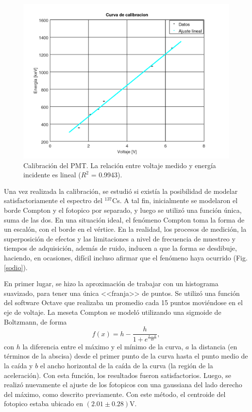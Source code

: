 \documentclass[twoside]{article}
\begin{document}
\begin{multicols}{2}
\begin{figure}[H]
    \centering
    \includegraphics[scale=0.4]{calibracion1.png}
    \caption{Calibración del PMT. La relación entre voltaje medido y energía incidente es lineal ($R^2$ = 0.9943).}
    \label{experimental}
\end{figure}

Una vez realizada la calibración, se estudió si existía la posibilidad de modelar satisfactoriamente el espectro del $^{137}$Cs. A tal fin, inicialmente se modelaron el borde Compton y el fotopico por separado, y luego se utilizó una función única, suma de las dos. En una situación ideal, el fenómeno Compton toma la forma de un escalón, con el borde en el vértice. En la realidad, los procesos de medición, la superposición de efectos y las limitaciones a nivel de frecuencia de muestreo y tiempos de adquisición, además de ruido, inducen a que la forma se desdibuje, haciendo, en ocasiones, difícil incluso afirmar que el fenómeno haya ocurrido (Fig.\ref{sodio}). 

En primer lugar, se hizo la aproximación de trabajar con un histograma suavizado, para tener una única <<franja>> de puntos. Se utilizó una función del software Octave que realizaba un promedio cada 15 puntos moviéndose en el eje de voltaje. La meseta Compton se modeló utilizando una sigmoide de Boltzmann, de forma
\begin{equation}
    f(x) = h - \frac{h}{1 + e^{\frac{x - a}{4b}}},
\end{equation}
con $h$ la diferencia entre el máximo y el mínimo de la curva, $a$ la distancia (en términos de la abscisa) desde el primer punto de la curva hasta el punto medio de la caída y $b$ el ancho horizontal de la caída de la curva (la región de la aceleración). Con esta función, los resultados fueron satisfactorios. Luego, se realizó nuevamente el ajuste de los fotopicos con una gaussiana del lado derecho del máximo, como descrito previamente. Con este método, el centroide del fotopico estaba ubicado en $(2.01 \pm 0.28)$V. 


\end{multicols}
\end{document}
